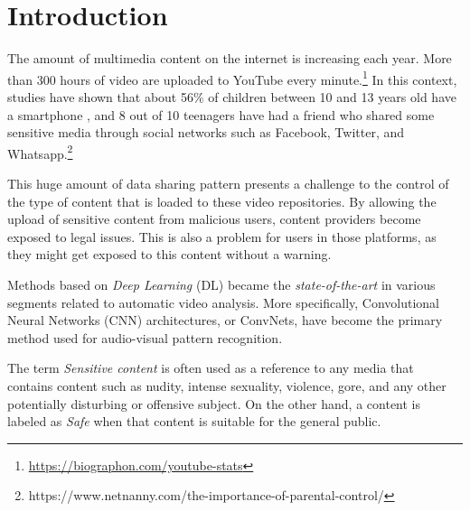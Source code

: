 \newpage

\chapter{Introduction}
\label{chap:introduction}

The amount of multimedia content on the internet is increasing each year.
More than 300 hours of video are uploaded to YouTube every minute.\footnote{\url{https://biographon.com/youtube-stats}}
In this context, studies have shown that about 56\% of children between 10 and 13 years old have a smartphone \cite{remosoftware,chollet2017xception}, and 8 out of 10 teenagers have had a friend who shared some sensitive media through social networks such as Facebook, Twitter, and Whatsapp.\footnote{https://www.netnanny.com/the-importance-of-parental-control/}



This huge amount of data sharing pattern presents a challenge to the control of the type of content that is loaded to these video repositories. By allowing the upload of sensitive content from malicious users, content providers become exposed to legal issues. This is also a problem for users in those platforms, as they might get exposed to this content without a warning.

Methods based on \textit{Deep Learning} (DL) became the \textit{state-of-the-art} in various segments related to automatic video analysis. More specifically, 
Convolutional Neural Networks (CNN) architectures, or ConvNets, have become the primary method used for audio-visual pattern recognition.

The term \emph{Sensitive content} is often used as a reference to any media that contains content such as nudity, intense sexuality, violence, gore, and any other potentially disturbing or offensive subject.
On the other hand, a content is labeled as \emph{Safe} when that content is suitable for the general public.


